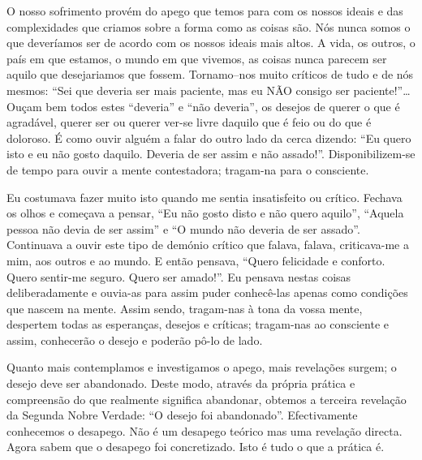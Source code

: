 O nosso sofrimento provém do apego que temos para com os nossos ideais e das
complexidades que criamos sobre a forma como as coisas são. Nós nunca somos o
que deveríamos ser de acordo com os nossos ideais mais altos. A vida, os outros,
o país em que estamos, o mundo em que vivemos, as coisas nunca parecem ser
aquilo que desejariamos que fossem. Tornamo--nos muito críticos de tudo e de nós
mesmos: “Sei que deveria ser mais paciente, mas eu NÃO consigo ser
paciente!”\ldots{} Ouçam bem todos estes “deveria” e “não deveria”, os desejos
de querer o que é agradável, querer ser ou querer ver-se livre daquilo que é
feio ou do que é doloroso. É como ouvir alguém a falar do outro lado da cerca
dizendo: “Eu quero isto e eu não gosto daquilo. Deveria de ser assim e não
assado!”. Disponibilizem-se de tempo para ouvir a mente contestadora; tragam-na
para o consciente.

Eu costumava fazer muito isto quando me sentia insatisfeito ou crítico. Fechava
os olhos e começava a pensar, “Eu não gosto disto e não quero aquilo”, “Aquela
pessoa não devia de ser assim” e “O mundo não deveria de ser assado”. Continuava
a ouvir este tipo de demónio crítico que falava, falava, criticava-me a mim, aos
outros e ao mundo. E então pensava, “Quero felicidade e conforto. Quero
sentir-me seguro. Quero ser amado!”. Eu pensava nestas coisas deliberadamente e
ouvia-as para assim puder conhecê-las apenas como condições que nascem na mente.
Assim sendo, tragam-nas à tona da vossa mente, despertem todas as esperanças,
desejos e críticas; tragam-nas ao consciente e assim, conhecerão o desejo e
poderão pô-lo de lado.

Quanto mais contemplamos e investigamos o apego, mais revelações surgem; o
desejo deve ser abandonado. Deste modo, através da própria prática e compreensão
do que realmente significa abandonar, obtemos a terceira revelação da Segunda
Nobre Verdade: “O desejo foi abandonado”. Efectivamente conhecemos o desapego.
Não é um desapego teórico mas uma revelação directa. Agora sabem que o desapego
foi concretizado. Isto é tudo o que a prática é.

